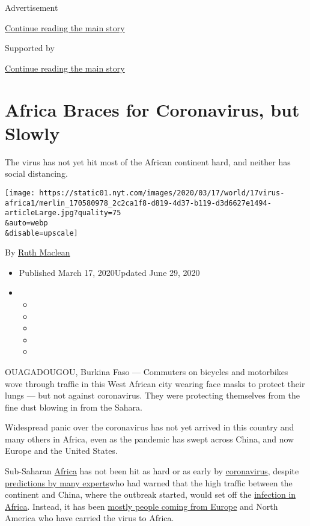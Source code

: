 Advertisement

\protect\hyperlink{after-top}{Continue reading the main story}

Supported by

\protect\hyperlink{after-sponsor}{Continue reading the main story}

\hypertarget{africa-braces-for-coronavirus-but-slowly}{%
\section{Africa Braces for Coronavirus, but
Slowly}\label{africa-braces-for-coronavirus-but-slowly}}

The virus has not yet hit most of the African continent hard, and
neither has social distancing.

\texttt{[image: https://static01.nyt.com/images/2020/03/17/world/17virus-africa1/merlin\_170580978\_2c2ca1f8-d819-4d37-b119-d3d6627e1494-articleLarge.jpg?quality=75\\\&auto=webp\\\&disable=upscale]}

By \href{https://www.nytimes.com/by/ruth-maclean}{Ruth Maclean}

\begin{itemize}
\item
  Published March 17, 2020Updated June 29, 2020
\item
  \begin{itemize}
  \item
  \item
  \item
  \item
  \item
  \end{itemize}
\end{itemize}

OUAGADOUGOU, Burkina Faso --- Commuters on bicycles and motorbikes wove
through traffic in this West African city wearing face masks to protect
their lungs --- but not against coronavirus. They were protecting
themselves from the fine dust blowing in from the Sahara.

Widespread panic over the coronavirus has not yet arrived in this
country and many others in Africa, even as the pandemic has swept across
China, and now Europe and the United States.

Sub-Saharan
\href{https://www.nytimes.com/2020/06/29/world/africa/Africa-middle-class-coronavirus.html}{Africa}
has not been hit as hard or as early by
\href{https://www.nytimes.com/2020/05/17/world/africa/coronavirus-kano-nigeria-hotspot.html}{coronavirus},
despite
\href{https://www.nytimes.com/2020/02/06/world/africa/africa-coronavirus-china.html}{predictions
by many experts}who had warned that the high traffic between the
continent and China, where the outbreak started, would set off the
\href{https://www.nytimes.com/2020/06/29/world/africa/Africa-middle-class-coronavirus.html}{infection
in Africa}. Instead, it has been
\href{https://www.afro.who.int/news/more-15-countries-africa-report-covid-19-cases}{mostly
people coming from Europe} and North America who have carried the virus
to Africa.

